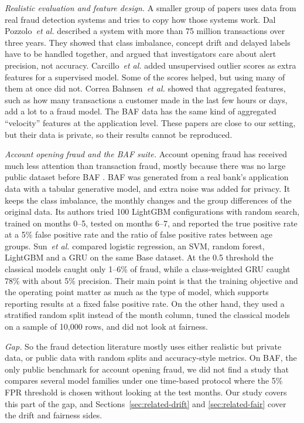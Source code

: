 \textit{Realistic evaluation and feature design.} A smaller group of papers uses data from real
fraud detection systems and tries to copy how those systems work. Dal Pozzolo~\textit{et al.}
\cite{dalpozzolo2018credit} described a system with more than 75 million transactions over three
years. They showed that class imbalance, concept drift and delayed labels have to be handled
together, and argued that investigators care about alert precision, not accuracy.
Carcillo~\textit{et al.} \cite{carcillo2021combining} added unsupervised outlier scores as extra
features for a supervised model. Some of the scores helped, but using many of them at once did not.
Correa Bahnsen~\textit{et al.} \cite{bahnsen2016feature} showed that aggregated features, such as
how many transactions a customer made in the last few hours or days, add a lot to a fraud model. The
BAF data has the same kind of aggregated ``velocity'' features at the application level. These
papers are close to our setting, but their data is private, so their results cannot be reproduced.

\textit{Account opening fraud and the BAF suite.} Account opening fraud has received much less
attention than transaction fraud, mostly because there was no large public dataset before BAF
\cite{jesus2022turning}. BAF was generated from a real bank's application data with a tabular
generative model, and extra noise was added for privacy. It keeps the class imbalance, the monthly
changes and the group differences of the original data. Its authors tried 100 LightGBM
configurations with random search, trained on months 0--5, tested on months 6--7, and reported the
true positive rate at a 5\% false positive rate and the ratio of false positive rates between age
groups. Sun~\textit{et al.} \cite{sun2025objective} compared logistic regression, an SVM, random
forest, LightGBM and a GRU on the same Base dataset. At the 0.5 threshold the classical models
caught only 1--6\% of fraud, while a class-weighted GRU caught 78\% with about 5\% precision. Their
main point is that the training objective and the operating point matter as much as the type of
model, which supports reporting results at a fixed false positive rate. On the other hand, they used
a stratified random split instead of the month column, tuned the classical models on a sample of
10{,}000 rows, and did not look at fairness.

\textit{Gap.} So the fraud detection literature mostly uses either realistic but private data, or
public data with random splits and accuracy-style metrics. On BAF, the only public benchmark for
account opening fraud, we did not find a study that compares several model families under one
time-based protocol where the 5\% FPR threshold is chosen without looking at the test months. Our
study covers this part of the gap, and Sections~\ref{sec:related-drift} and \ref{sec:related-fair}
cover the drift and fairness sides.

